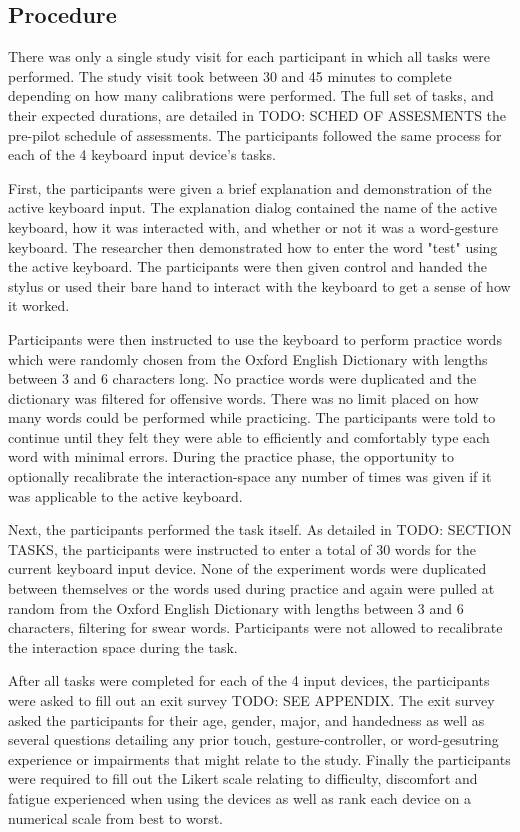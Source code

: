 \subsection{Procedure} \label{pre_procedure}

There was only a single study visit for each participant in which all tasks were performed. The study visit took between 30 and 45 minutes to complete depending on how many calibrations were performed. The full set of tasks, and their expected durations, are detailed in TODO: SCHED OF ASSESMENTS the pre-pilot schedule of assessments. The participants followed the same process for each of the 4 keyboard input device's tasks.

First, the participants were given a brief explanation and demonstration of the active keyboard input. The explanation dialog contained the name of the active keyboard, how it was interacted with, and whether or not it was a word-gesture keyboard. The researcher then demonstrated how to enter the word "test" using the active keyboard. The participants were then given control and handed the stylus or used their bare hand to interact with the keyboard to get a sense of how it worked.

Participants were then instructed to use the keyboard to perform practice words which were randomly chosen from the Oxford English Dictionary with lengths between 3 and 6 characters long. No practice words were duplicated and the dictionary was filtered for offensive words. There was no limit placed on how many words could be performed while practicing. The participants were told to continue until they felt they were able to efficiently and comfortably type each word with minimal errors. During the practice phase, the opportunity to optionally recalibrate the interaction-space any number of times was given if it was applicable to the active keyboard.

Next, the participants performed the task itself. As detailed in TODO: SECTION TASKS, the participants were instructed to enter a total of 30 words for the current keyboard input device. None of the experiment words were duplicated between themselves or the words used during practice and again were pulled at random from the Oxford English Dictionary with lengths between 3 and 6 characters, filtering for swear words. Participants were not allowed to recalibrate the interaction space during the task. 

After all tasks were completed for each of the 4 input devices, the participants were asked to fill out an exit survey TODO: SEE APPENDIX. The exit survey asked the participants for their age, gender, major, and handedness as well as several questions detailing any prior touch, gesture-controller, or word-gesutring experience or impairments that might relate to the study. Finally the participants were required to fill out the Likert scale relating to difficulty, discomfort and fatigue experienced when using the devices as well as rank each device on a numerical scale from best to worst.

